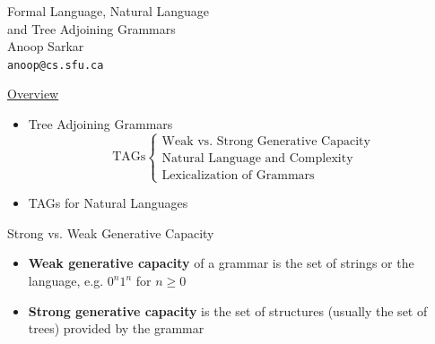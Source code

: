\documentclass[landscape]{slides}
\begin{document}
\begin{slide}
\vspace{2in}
\begin{center}
\Large {\color{blue} Formal Language, Natural Language\\ and Tree Adjoining Grammars}\\
\vspace{2in}
\normalsize \color{red}Anoop Sarkar\\
{\tt anoop@cs.sfu.ca}
\end{center}
\end{slide}

\begin{slide}{\underline{Overview}}
\begin{itemize}
\item Tree Adjoining Grammars \[ \textrm{TAGs} \left\{ 
\begin{array}{l}
\textrm{Weak vs. Strong Generative Capacity}\\
\textrm{Natural Language and Complexity}\\
\textrm{Lexicalization of Grammars}
\end{array}
\right. \]
\item TAGs for Natural Languages
\end{itemize}
\end{slide}


\begin{slide}{Strong vs. Weak Generative Capacity}
\begin{itemize}
\item {\bf Weak generative capacity} of a grammar is the set of
strings or the language, e.g. $0^n 1^n$ for $n \geq 0$
\item {\bf Strong generative capacity} is the set of structures
(usually the set of trees) provided by the grammar
\end{itemize}
\end{slide}
\end{document}
